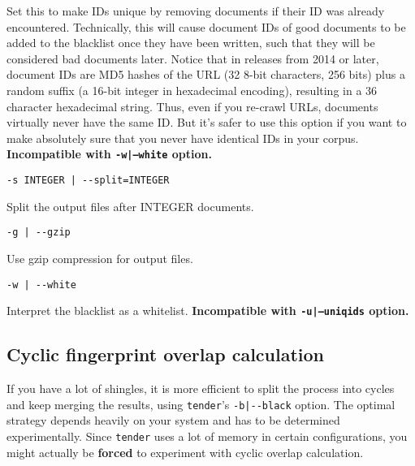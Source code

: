 \documentclass[12pt,a4paper]{article}
\newcommand{\Maro}[1]{\marginpar{\tiny\texttt{#1}}}
\begin{document}
Set this to make IDs unique by removing documents if their ID was already encountered.
Technically, this will cause document IDs of good documents to be added to the blacklist once they have been written, such that they will be considered bad documents later.
Notice that in releases from 2014 or later, document IDs are MD5 hashes of the URL (32 8-bit characters, 256 bits) plus a random suffix (a 16-bit integer in hexadecimal encoding), resulting in a 36 character hexadecimal string.
Thus, even if you re-crawl URLs, documents virtually never have the same ID.
But it's safer to use this option if you want to make absolutely sure that you never have identical IDs in your corpus.
\textbf{Incompatible with \texttt{-w|--white} option.}

\begin{center}\Maro{-s|-{-}split}
\begin{verbatim}
-s INTEGER | --split=INTEGER
\end{verbatim}
\end{center}

Split the output files after INTEGER documents.

\begin{center}\Maro{-g|-{-}gzip}
\begin{verbatim}
-g | --gzip
\end{verbatim}
\end{center}

Use gzip compression for output files.

\begin{center}\Maro{-w|-{-}white}
\begin{verbatim}
-w | --white
\end{verbatim}
\end{center}

Interpret the blacklist as a whitelist.
\textbf{Incompatible with \texttt{-u|--uniqids} option.}

\subsection{Cyclic fingerprint overlap calculation}
\label{sec:cyclicshingle}

If you have a lot of shingles, it is more efficient to split the process into cycles and keep merging the results, using \texttt{tender}'s \texttt{-b|-{-}black} option.
The optimal strategy depends heavily on your system and has to be determined experimentally.
Since \texttt{tender} uses a lot of memory in certain configurations, you might actually be \textbf{forced} to experiment with cyclic overlap calculation.
\end{document}
